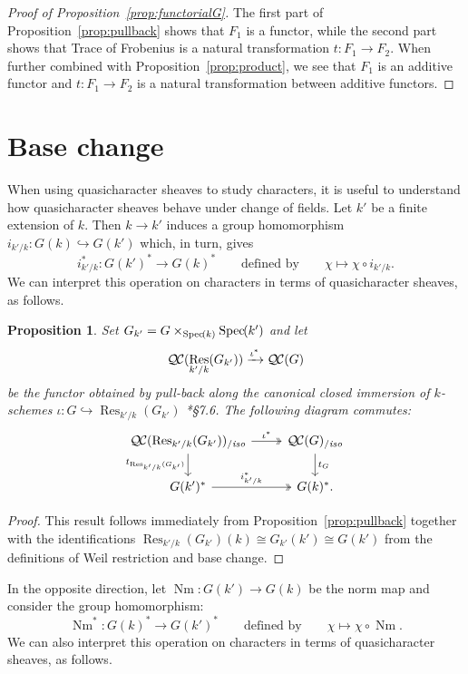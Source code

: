 \documentclass[11pt]{amsart}
\theoremstyle{plain}
\newtheorem{proposition}[theorem]{Proposition}
\theoremstyle{definition}
\theoremstyle{remark}
\newcommand{\Spec}[1]{{\operatorname{Spec}\hskip-1pt( #1 )}}
\DeclareMathOperator{\Res}{Res}
\DeclareMathOperator{\Nm}{Nm}
\newcommand{\QC}{{\mathcal{Q\hskip-0.8pt C}}}
\newcommand{\QCiso}[1]{\QC(#1)_{/\textit{iso}}}
\newcommand{\trFrob}[1]{t_{#1}}
\begin{document}
\begin{proof}[Proof of Proposition~\ref{prop:functorialG}]
The first part of Proposition~\ref{prop:pullback} shows that $F_1$ is a functor,
while the second part shows that Trace of Frobenius is a natural transformation
$t: F_1 \to F_2$. When further combined with Proposition~\ref{prop:product},
we see that $F_1$ is an additive functor and $t: F_1 \to F_2$ is a natural
transformation between additive functors.
\end{proof}

\section{Base change}\label{sec:basechange}

When using quasicharacter sheaves to study characters, it is useful to understand
how quasicharacter sheaves behave under change of fields.
Let $k'$ be a finite extension of $k$. Then $k\to k'$ induces a group homomorphism
$i_{k'/k} : G(k) \hookrightarrow G(k')$ which, in turn, gives
\[
i_{k'/k}^* : G(k')^* \to G(k)^* \qquad \text{defined by}\qquad \chi \mapsto \chi\circ i_{k'/k}.
\]
We can interpret this operation on characters in terms of quasicharacter sheaves, as follows.
%

\begin{proposition} \label{prop:csbe}
Set $G_{k'} = G\times_\Spec{k} \Spec{k'}$ and let
\[
\QC(\Res_{k'/k}(G_{k'})) \xrightarrow{\iota^*} \QC(G)
\]
be the functor obtained by pull-back along the canonical closed immersion of $k$-schemes
$\iota : G \hookrightarrow \Res_{k'/k}(G_{k'})$
\cite{bosch-lutkebohmert-reynaud:NeronModels}*{\S 7.6}. 
The following diagram commutes:
\[
\begin{tikzcd}
\QCiso{\Res_{k'/k}(G_{k'})} \arrow[two heads]{r}{\iota^*} \dar[swap]{\trFrob{\Res_{k'/k}(G_{k'})}} & \QCiso{G} \dar{\trFrob{G}} \\
G(k')^* \arrow[two heads]{r}{i_{k'/k}^*} & G(k)^*.
\end{tikzcd}
\]
\end{proposition}
\begin{proof}
This result follows immediately from Proposition~\ref{prop:pullback} together with the identifications
$\Res_{k'/k}(G_{k'})(k) \cong G_{k'}(k') \cong G(k')$ from the definitions of Weil restriction and base change.
\end{proof}

In the opposite direction, let $\Nm : G(k') \to G(k)$ be the norm map and consider the group homomorphism:
\[
\Nm^* : G(k)^* \to G(k')^* \qquad \text{defined by}\qquad \chi \mapsto \chi\circ \Nm.
\]
We can also interpret this operation on characters in terms of quasicharacter sheaves, as follows.
\end{document}
